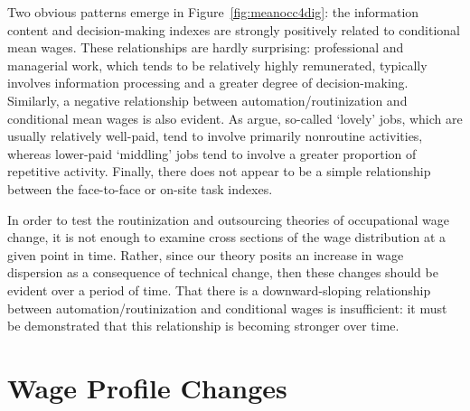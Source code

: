 Two obvious patterns emerge in Figure~\ref{fig:meanocc4dig}: the information content and decision-making indexes are strongly positively related to conditional mean wages. These relationships are hardly surprising: professional and managerial work, which tends to be relatively highly remunerated, typically involves information processing and a greater degree of decision-making. Similarly, a negative relationship between automation/routinization and conditional mean wages is also evident. As \citet{Goos2009} argue, so-called `lovely' jobs, which are usually relatively well-paid, tend to involve primarily nonroutine activities, whereas lower-paid `middling' jobs tend to involve a greater proportion of repetitive activity. Finally, there does not appear to be a simple relationship between the face-to-face or on-site task indexes.

In order to test the routinization and outsourcing theories of occupational wage change, it is not enough to examine cross sections of the wage distribution at a given point in time. Rather, since our theory posits an increase in wage dispersion as a consequence of technical change, then these changes should be evident over a period of time. That there is a downward-sloping relationship between automation/routinization and conditional wages is insufficient: it must be demonstrated that this relationship is becoming stronger over time.

\section{Wage Profile Changes}\label{sec:direct}


